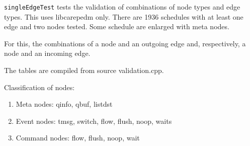 \texttt{singleEdgeTest} tests the validation of combinations of node types and edge types. This uses libcarepedm only. There are 1936 schedules
with at least one edge and two nodes tested. Some schedule are enlarged with meta nodes.

For this, the combinations of a node and an outgoing edge and,
respectively, a node and an incoming edge.

The tables are compiled from source validation.cpp.

Classification of nodes:
\begin{enumerate}
\item Meta nodes: qinfo, qbuf, listdst
\item Event nodes: tmsg, switch, flow, flush, noop, waits
\item Command nodes: flow, flush, noop, wait
\end{enumerate}

